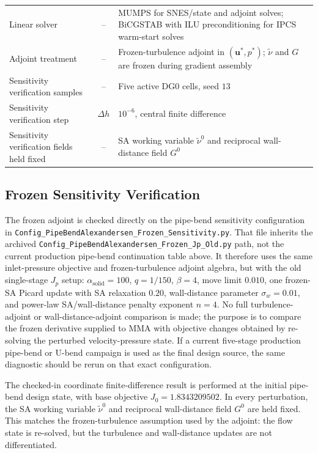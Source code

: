 \begin{table}[htbp]
\begin{tabularx}{\textwidth}{l c X}
			Linear solver & -- & MUMPS for SNES/state and adjoint solves; BiCGSTAB with ILU preconditioning for IPCS warm-start solves \\
		Adjoint treatment & -- & Frozen-turbulence adjoint in $(\mathbf{u}^*,p^*)$; $\tilde{\nu}$ and $G$ are frozen during gradient assembly \\
		Sensitivity verification samples & -- & Five active DG0 cells, seed $13$ \\
		Sensitivity verification step & $\Delta h$ & $10^{-6}$, central finite difference \\
		Sensitivity verification fields held fixed & -- & SA working variable $\tilde{\nu}^{0}$ and reciprocal wall-distance field $G^{0}$ \\
		\hline
	\end{tabularx}
\end{table}

\subsection{Frozen Sensitivity Verification}
\label{subsec:alexandersen_pipebend_sensitivity}
	The frozen adjoint is checked directly on the pipe-bend sensitivity configuration in \texttt{Config\_PipeBendAlexandersen\_Frozen\_Sensitivity.py}. That file inherits the archived \texttt{Config\_PipeBendAlexandersen\_Frozen\_Jp\_Old.py} path, not the current production pipe-bend continuation table above. It therefore uses the same inlet-pressure objective and frozen-turbulence adjoint algebra, but with the old single-stage $J_p$ setup: $\alpha_{\mathrm{solid}}=100$, $q=1/150$, $\beta=4$, move limit $0.010$, one frozen-SA Picard update with SA relaxation $0.20$, wall-distance parameter $\sigma_w=0.01$, and power-law SA/wall-distance penalty exponent $n=4$. No full turbulence-adjoint or wall-distance-adjoint comparison is made; the purpose is to compare the frozen derivative supplied to MMA with objective changes obtained by re-solving the perturbed velocity-pressure state. If a current five-stage production pipe-bend or U-bend campaign is used as the final design source, the same diagnostic should be rerun on that exact configuration.

	The checked-in coordinate finite-difference result is performed at the initial pipe-bend design state, with base objective
	$J_0=1.8343209502$. In every perturbation, the SA working variable $\tilde{\nu}^{0}$ and reciprocal wall-distance field $G^{0}$ are held fixed. This matches the frozen-turbulence assumption used by the adjoint: the flow state is re-solved, but the turbulence and wall-distance updates are not differentiated.

